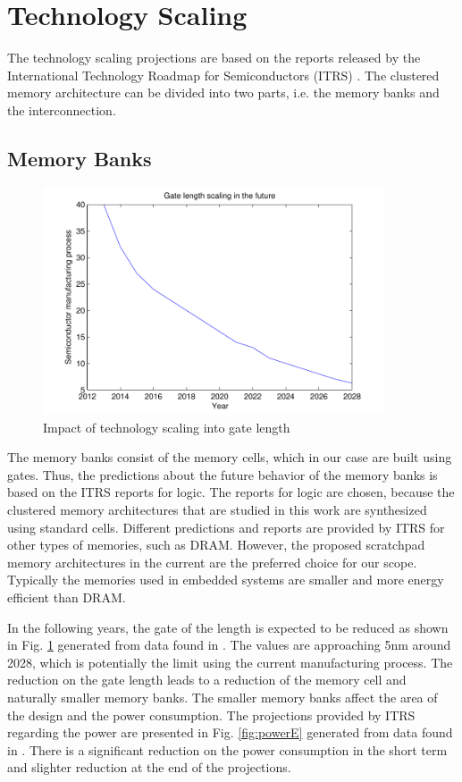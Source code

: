 \section{Technology Scaling}
\label{future}

The technology scaling projections are based on the reports released by the International Technology Roadmap for Semiconductors (ITRS)  \cite{itrs}.
The clustered memory architecture can be divided into two parts, i.e. the memory banks and the interconnection.

\subsection{Memory Banks}

\begin{figure}
 \centering
 \includegraphics[width = 0.9\textwidth]{E/gate.pdf}
  \caption{Impact of technology scaling into gate length}
 \label{fig:gateE}
 \end{figure}
 
The memory banks consist of the memory cells, which in our case are built using gates.
Thus, the predictions about the future behavior of the memory banks is based on the ITRS reports for logic.
The reports for logic are chosen, because the clustered memory architectures that are studied in this work are synthesized using standard cells.
Different predictions and reports are provided by ITRS for other types of memories, such as DRAM.
However, the proposed scratchpad memory architectures in the current are the preferred choice for our scope.
Typically the memories used in embedded systems are smaller and more energy efficient than DRAM.

In the following years, the gate of the length is expected to be reduced as shown in Fig. \ref{fig:gateE} generated from data found in \cite{itrs2}.
The values are approaching 5nm around 2028, which is potentially the limit using the current manufacturing process.
The reduction on the gate length leads to a reduction of the memory cell and naturally smaller memory banks.
The smaller memory banks affect the area of the design and the power consumption.
The projections provided by ITRS regarding the power are presented in Fig. \ref{fig:powerE} generated from data found in \cite{itrs2}. 
There is a significant reduction on the power consumption in the short term and slighter reduction at the end of the projections.

